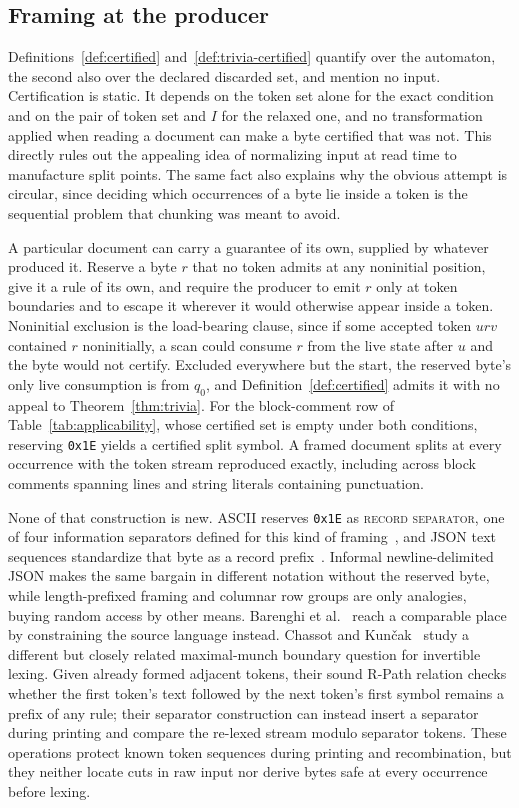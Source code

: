 \documentclass[11pt,a4paper]{article}
\theoremstyle{definition}
\theoremstyle{plain}
\newcommand{\code}[1]{\texttt{#1}}
\begin{document}
\subsection{Framing at the producer}
\label{sec:framing}

Definitions~\ref{def:certified} and~\ref{def:trivia-certified} quantify over the automaton, the second also over the
declared discarded set, and mention no input. Certification is static. It depends on the token set alone for the exact
condition and on the pair of token set and $I$ for the relaxed one, and no transformation applied when reading a
document can make a byte certified that was not. This directly rules out the appealing idea of normalizing input at read
time to manufacture split points. The same fact also explains why the obvious attempt is circular, since deciding which
occurrences of a byte lie inside a token is the sequential problem that chunking was meant to avoid.

A particular document can carry a guarantee of its own, supplied by whatever produced it. Reserve a byte $r$ that no
token admits at any noninitial position, give it a rule of its own, and require the producer to emit $r$ only at token
boundaries and to escape it wherever it would otherwise appear inside a token. Noninitial exclusion is the load-bearing
clause, since if some accepted token $urv$ contained $r$ noninitially, a scan could consume $r$ from the live state
after $u$ and the byte would not certify. Excluded everywhere but the start, the reserved byte's only live consumption
is from $q_0$, and Definition~\ref{def:certified} admits it with no appeal to Theorem~\ref{thm:trivia}. For the
block-comment row of Table~\ref{tab:applicability}, whose certified set is empty under both conditions, reserving
\code{0x1E} yields a certified split symbol. A framed document splits at every occurrence with the token stream
reproduced exactly, including across block comments spanning lines and string literals containing punctuation.

None of that construction is new. ASCII reserves \code{0x1E} as \textsc{record separator}, one of four information
separators defined for this kind of framing~\cite{cerf1969ascii}, and JSON text sequences standardize that byte as a
record prefix~\cite{williams2015rfc7464}. Informal newline-delimited JSON makes the same bargain in different notation
without the reserved byte, while length-prefixed framing and columnar row groups are only analogies, buying random
access by other means. Barenghi et al.~\cite{barenghi2015parallel} reach a comparable place by constraining the source
language instead. Chassot and Kun{\v{c}}ak~\cite{chassot2026ziplex} study a different but closely related maximal-munch
boundary question for invertible lexing. Given already formed adjacent tokens, their sound R-Path relation checks
whether the first token's text followed by the next token's first symbol remains a prefix of any rule; their separator
construction can instead insert a separator during printing and compare the re-lexed stream modulo separator tokens.
These operations protect known token sequences during printing and recombination, but they neither locate cuts in raw
input nor derive bytes safe at every occurrence before lexing.
\end{document}
